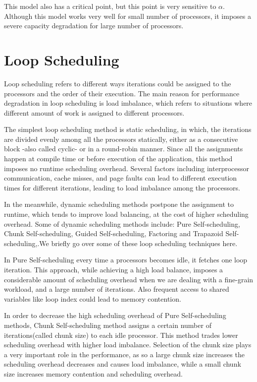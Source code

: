 This model also has a critical point, but this point is very sensitive to $\alpha$. Although this model works very well for small number of processors, it imposes a severe capacity degradation for large number of processors.

\vspace{\baselineskip}
\section{Loop Scheduling}
Loop scheduling refers to different ways iterations could be assigned to the processors and the order of their execution. 
The main reason for performance degradation in loop scheduling is load imbalance, which refers to situations where different amount of work is assigned to different processors\cite{ciorba2018openmp}.    

The simplest loop scheduling method is static scheduling, in which, the iterations are divided evenly among all the processors statically, either as a consecutive block -also called cyclic- or in a round-robin manner\cite{liu1994safe}. Since all the assignments happen at compile time or before execution of the application, this method imposes no runtime scheduling overhead. Several factors including interprocessor communication, cache misses, and page faults can lead to different execution times for different iterations, leading to load imbalance among the processors\cite{philip1995increasing}.

In the meanwhile, dynamic scheduling methods postpone the assignment to runtime, which tends to improve load balancing, at the cost of higher scheduling overhead. Some of dynamic scheduling methods include: Pure Self-scheduling, Chunk Self-scheduling, Guided Self-scheduling\cite{polychronopoulos1987guided}, Factoring\cite{hummel1992factoring} and Trapazoid Self-scheduling\cite{tzen1993trapezoid},\cite{liu1994safe}.We briefly go over some of these loop scheduling techniques here.


In Pure Self-scheduling every time a processors becomes idle, it fetches one loop iteration. This approach, while achieving a high load balance, imposes a considerable amount of scheduling overhead when we are dealing with a fine-grain workload, and a large number of iterations. Also frequent access to shared variables like loop index could lead to memory contention\cite{liu1994safe}. 

In order to decrease the high scheduling overhead of Pure Self-scheduling methods, Chunk Self-scheduling method assigns a certain number of iterations(called chunk size) to each idle processor. This method trades lower scheduling overhead with higher load imbalance. Selection of the chunk size plays a very important role in the performance, as so a large chunk size increases the scheduling overhead decreases and causes load imbalance, while a small chunk size increases memory contention and scheduling overhead\cite{liu1994safe}. 

